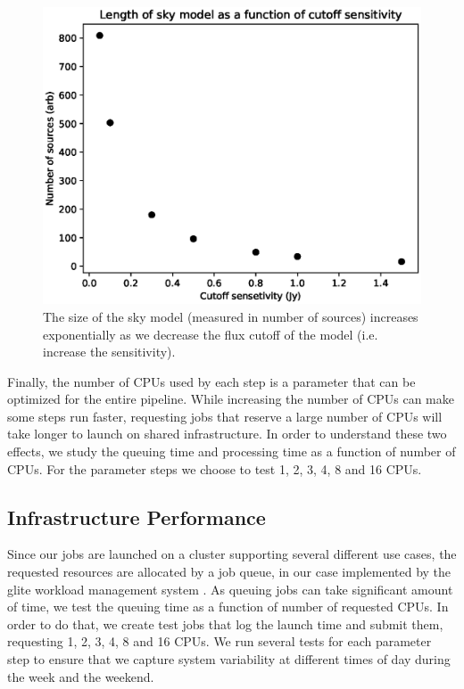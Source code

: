 \begin{figure}
    \includegraphics[width=0.95\linewidth]{figures/skymodel_size_vs_Jy.eps}
      \caption{The size of the sky model (measured in number of sources) increases exponentially as we decrease the flux cutoff of the model (i.e. increase the sensitivity).}
	\label{fig:skymodel_size}
\end{figure}


Finally, the number of CPUs used by each step is a parameter that can be optimized for the entire pipeline. While increasing the number of CPUs can make some steps run faster, requesting jobs that reserve a large number of CPUs will take longer to launch on shared infrastructure. In order to understand these two effects, we study the queuing time and processing time as a function of number of CPUs. For the parameter steps we choose to test 1, 2, 3, 4, 8 and 16 CPUs. 

\subsection{Infrastructure Performance}

Since our jobs are launched on a cluster supporting several different use cases, the requested resources are allocated by a job queue, in our case implemented by the glite workload management system \citep{glite-wms}. As queuing jobs can take significant amount of time, we test the queuing time as a function of number of requested CPUs. In order to do that, we create test jobs that log the launch time and submit them, requesting 1, 2, 3, 4, 8 and 16 CPUs. We run several tests for each parameter step to ensure that we capture system variability at different times of day during the week and the weekend. 

